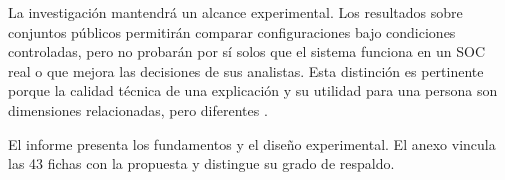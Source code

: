 La investigación mantendrá un alcance experimental. Los resultados sobre conjuntos públicos permitirán comparar configuraciones bajo condiciones controladas, pero no probarán por sí solos que el sistema funciona en un SOC real o que mejora las decisiones de sus analistas. Esta distinción es pertinente porque la calidad técnica de una explicación y su utilidad para una persona son dimensiones relacionadas, pero diferentes \parencite{Cecchi2026Connecting,Tayari2026Clarity}.

El informe presenta los fundamentos y el diseño experimental. El anexo vincula las 43 fichas con la propuesta y distingue su grado de respaldo.
